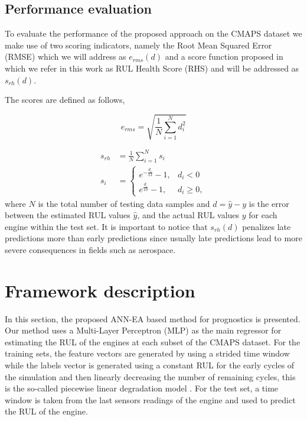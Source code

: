 \documentclass[12pt]{IEEEtran}%
\begin{document}
\subsection{Performance evaluation}
\label{sec:rul_metrics}

To evaluate the performance of the proposed approach on the CMAPS dataset we make use of two scoring indicators, namely the Root Mean Squared Error (RMSE) which we will address as $e_{rms}(d)$ and a score function proposed in \cite{Saxena2008} which we refer in this work as RUL Health Score (RHS) and will be addressed as $s_{rh}(d)$. 

\pagebreak

The scores are defined as follows,

\begin{equation}
e_{rms} = \sqrt{ \frac{1}{N} \sum_{i=1}^{N}{d_i^2}}
\label{eq:rmse}
\end{equation}

\begin{align}
s_{rh} &= \frac{1}{N} \sum_{i=1}^{N}{s_i} \nonumber \\
s_i &= \begin{cases} 
      e^{-\frac{d_i}{13}} - 1, & d_i < 0 \\
      e^{\frac{d_i}{10}} - 1, & d_i \geq 0,
\end{cases}
\label{eq:rhs}
\end{align}
where $N$ is the total number of testing data samples and $d = \hat{y} - y$ is the error between the estimated RUL values $\hat{y}$, and the actual RUL values $y$ for each engine within the test set. It is important to notice that $s_{rh}(d)$ penalizes late predictions more than early predictions since usually late predictions lead to more severe consequences in fields such as aerospace.



\section{Framework description}
\label{sec:method}

In this section, the proposed ANN-EA based method for prognostics is presented. Our method uses a Multi-Layer Perceptron (MLP) as the main regressor for estimating the RUL of the engines at each subset of the CMAPS dataset. For the training sets, the feature vectors are generated by using a strided time window while the labels vector is generated using a constant RUL for the early cycles of the simulation and then linearly decreasing the number of remaining cycles, this is the so-called piecewise linear degradation model \cite{Ramasso2014}. For the test set, a time window is taken from the last sensors readings of the engine and used to predict the RUL of the engine.
\end{document}
